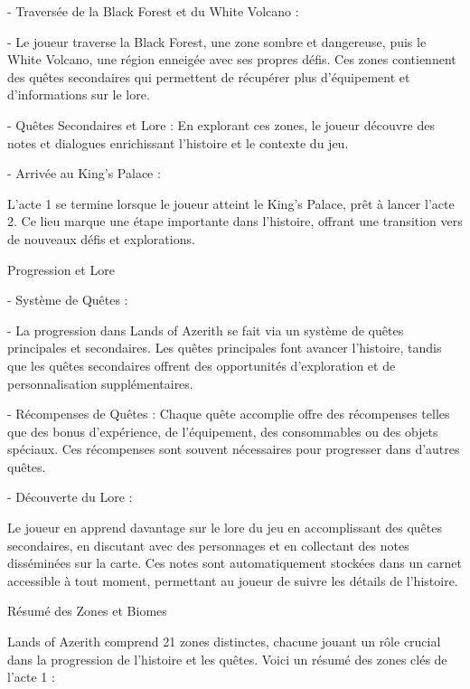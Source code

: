   

- Traversée de la Black Forest et du White Volcano : 

  - Le joueur traverse la Black Forest, une zone sombre et dangereuse, puis le White Volcano, une région enneigée avec ses propres défis. Ces zones contiennent des quêtes secondaires qui permettent de récupérer plus d'équipement et d'informations sur le lore. 

  - Quêtes Secondaires et Lore : En explorant ces zones, le joueur découvre des notes et dialogues enrichissant l'histoire et le contexte du jeu. 

  

- Arrivée au King's Palace : 

 L'acte 1 se termine lorsque le joueur atteint le King's Palace, prêt à lancer l'acte 2. Ce lieu marque une étape importante dans l'histoire, offrant une transition vers de nouveaux défis et explorations. 

  

Progression et Lore 

  

- Système de Quêtes : 

  - La progression dans Lands of Azerith se fait via un système de quêtes principales et secondaires. Les quêtes principales font avancer l'histoire, tandis que les quêtes secondaires offrent des opportunités d'exploration et de personnalisation supplémentaires. 

  - Récompenses de Quêtes : Chaque quête accomplie offre des récompenses telles que des bonus d'expérience, de l'équipement, des consommables ou des objets spéciaux. Ces récompenses sont souvent nécessaires pour progresser dans d'autres quêtes. 

  

- Découverte du Lore : 

  Le joueur en apprend davantage sur le lore du jeu en accomplissant des quêtes secondaires, en discutant avec des personnages et en collectant des notes disséminées sur la carte. Ces notes sont automatiquement stockées dans un carnet accessible à tout moment, permettant au joueur de suivre les détails de l'histoire. 

  

Résumé des Zones et Biomes 

  

Lands of Azerith comprend 21 zones distinctes, chacune jouant un rôle crucial dans la progression de l'histoire et les quêtes. Voici un résumé des zones clés de l'acte 1 : 

